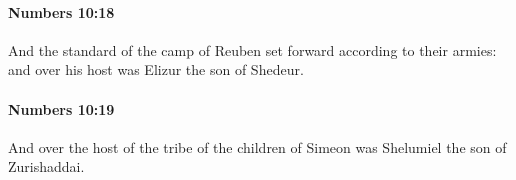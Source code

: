 		\paragraph{Numbers 10:18} %
			\label{NUMBERS-10-18}

			And the standard of the camp of Reuben set forward according to their armies: and over his host was Elizur the son of Shedeur.


		\paragraph{Numbers 10:19} %
			\label{NUMBERS-10-19}

			And over the host of the tribe of the children of Simeon was Shelumiel the son of Zurishaddai.


